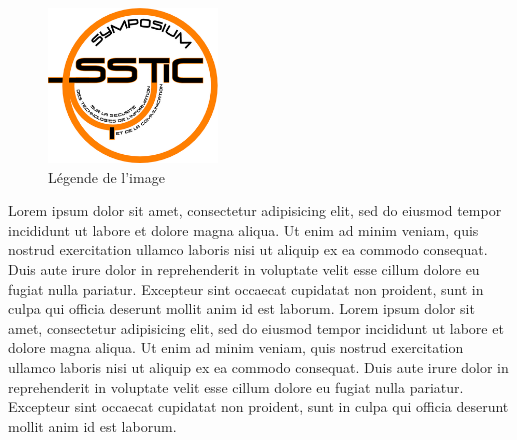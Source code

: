 
\begin{figure}[ht]
  \centering
  \includegraphics[width=0.4\textwidth]{Fenioux/img/archi}
  \caption{Légende de l'image}
  \label{fig:fenioux:archi}
\end{figure}

Lorem ipsum dolor sit amet, consectetur adipisicing elit, sed do
eiusmod tempor incididunt ut labore et dolore magna aliqua. Ut enim ad
minim veniam, quis nostrud exercitation ullamco laboris nisi ut
aliquip ex ea commodo consequat. Duis aute irure dolor in
reprehenderit in voluptate velit esse cillum dolore eu fugiat nulla
pariatur. Excepteur sint occaecat cupidatat non proident, sunt in
culpa qui officia deserunt mollit anim id est laborum. Lorem ipsum
dolor sit amet, consectetur adipisicing elit, sed do eiusmod tempor
incididunt ut labore et dolore magna aliqua. Ut enim ad minim veniam,
quis nostrud exercitation ullamco laboris nisi ut aliquip ex ea
commodo consequat. Duis aute irure dolor in reprehenderit in voluptate
velit esse cillum dolore eu fugiat nulla pariatur. Excepteur sint
occaecat cupidatat non proident, sunt in culpa qui officia deserunt
mollit anim id est laborum.

